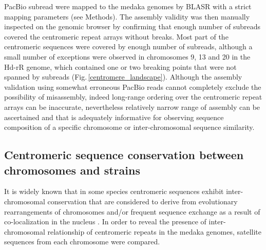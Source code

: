   PacBio subread were mapped to the medaka genomes by BLASR \cite{Chaisson2012} with a strict mapping parameters (see Methods). The assembly validity was then manually inspected on the genomic browser by confirming that enough number of subreads covered the centromeric repeat arrays without breaks. Most part of the centromeric sequences were covered by enough number of subreads, although a small number of exceptions were observed in chromosomes 9, 13 and 20 in the Hd-rR genome, which contained one or two breaking points that were not spanned by subreads (Fig.\,\ref{centromere_landscape}). Although the assembly validation using somewhat erroneous PacBio reads cannot completely exclude the possibility of misassembly, indeed long-range ordering over the centromeric repeat arrays can be inaccurate, nevertheless relatively narrow range of assembly can be ascertained and that is adequately informative for observing sequence composition of a specific chromosome or inter-chromosomal sequence similarity.


\subsection*{Centromeric sequence conservation between chromosomes and strains}
  It is widely known that in some species centromeric sequences exhibit inter-chromosomal conservation that are considered to derive from evolutionary rearrangements of chromosomes and/or frequent sequence exchange as a result of co-localization in the nucleus \cite{Willard1991}. In order to reveal the presence of inter-chromosomal relationship of centromeric repeats in the medaka genomes, satellite sequences from each chromosome were compared.

